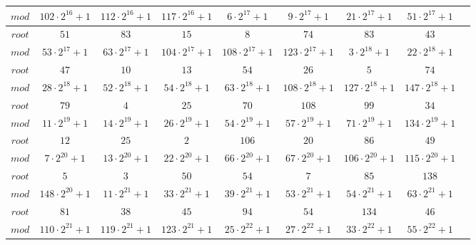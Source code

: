 \documentclass[12pt]{article}
\begin{document}
\begin{tabular}{|c|c|c|c|c|c|c|c|c|}
$mod$& $102\cdot 2^{16}+1$& $112\cdot 2^{16}+1$& $117\cdot 2^{16}+1$& $6\cdot 2^{17}+1$& $9\cdot 2^{17}+1$& $21\cdot 2^{17}+1$& $51\cdot 2^{17}+1$\\
\hline

$root$& $51$& $83$& $15$& $8$& $74$& $83$& $43$\\
\hline


$mod$& $53\cdot 2^{17}+1$& $63\cdot 2^{17}+1$& $104\cdot 2^{17}+1$& $108\cdot 2^{17}+1$& $123\cdot 2^{17}+1$& $3\cdot 2^{18}+1$& $22\cdot 2^{18}+1$\\
\hline

$root$& $47$& $10$& $13$& $54$& $26$& $5$& $74$\\
\hline


$mod$& $28\cdot 2^{18}+1$& $52\cdot 2^{18}+1$& $54\cdot 2^{18}+1$& $63\cdot 2^{18}+1$& $108\cdot 2^{18}+1$& $127\cdot 2^{18}+1$& $147\cdot 2^{18}+1$\\
\hline

$root$& $79$& $4$& $25$& $70$& $108$& $99$& $34$\\
\hline


$mod$& $11\cdot 2^{19}+1$& $14\cdot 2^{19}+1$& $26\cdot 2^{19}+1$& $54\cdot 2^{19}+1$& $57\cdot 2^{19}+1$& $71\cdot 2^{19}+1$& $134\cdot 2^{19}+1$\\
\hline

$root$& $12$& $25$& $2$& $106$& $20$& $86$& $49$\\
\hline


$mod$& $7\cdot 2^{20}+1$& $13\cdot 2^{20}+1$& $22\cdot 2^{20}+1$& $66\cdot 2^{20}+1$& $67\cdot 2^{20}+1$& $106\cdot 2^{20}+1$& $115\cdot 2^{20}+1$\\
\hline

$root$& $5$& $3$& $50$& $54$& $7$& $85$& $138$\\
\hline


$mod$& $148\cdot 2^{20}+1$& $11\cdot 2^{21}+1$& $33\cdot 2^{21}+1$& $39\cdot 2^{21}+1$& $53\cdot 2^{21}+1$& $54\cdot 2^{21}+1$& $63\cdot 2^{21}+1$\\
\hline

$root$& $81$& $38$& $45$& $94$& $54$& $134$& $46$\\
\hline


$mod$& $110\cdot 2^{21}+1$& $119\cdot 2^{21}+1$& $123\cdot 2^{21}+1$& $25\cdot 2^{22}+1$& $27\cdot 2^{22}+1$& $33\cdot 2^{22}+1$& $55\cdot 2^{22}+1$\\
\hline


\end{tabular}
\end{document}
